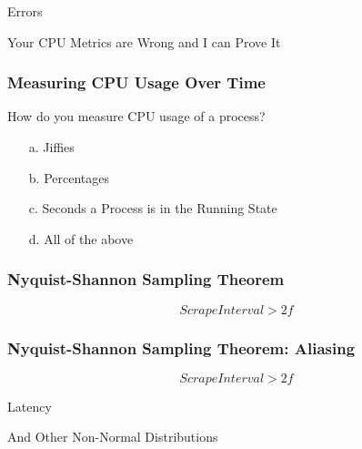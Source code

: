 \begin{frame}[standout]
    Errors

    \small
    Your CPU Metrics are Wrong and I can Prove It
\end{frame}

\begin{frame}[fragile]
    \frametitle{Measuring CPU Usage Over Time}

    How do you measure CPU usage of a process?
    \begin{enumerate}
        \item[a.] Jiffies
        \item[b.] Percentages
        \item[c.] Seconds a Process is in the Running State
        \item[d.] All of the above
    \end{enumerate}
\end{frame}

\begin{frame}
    \frametitle{Nyquist-Shannon Sampling Theorem}
    \begin{figure}[!h]
        \centering
        
    \end{figure}
    $$ Scrape Interval > 2f $$
\end{frame}
\begin{frame}
    \frametitle{Nyquist-Shannon Sampling Theorem: Aliasing}
    \begin{figure}[!h]
        \centering
        
    \end{figure}
    $$ Scrape Interval > 2f $$
\end{frame}

\begin{frame}[standout]
    Latency

    \small
    And Other Non-Normal Distributions
\end{frame}


